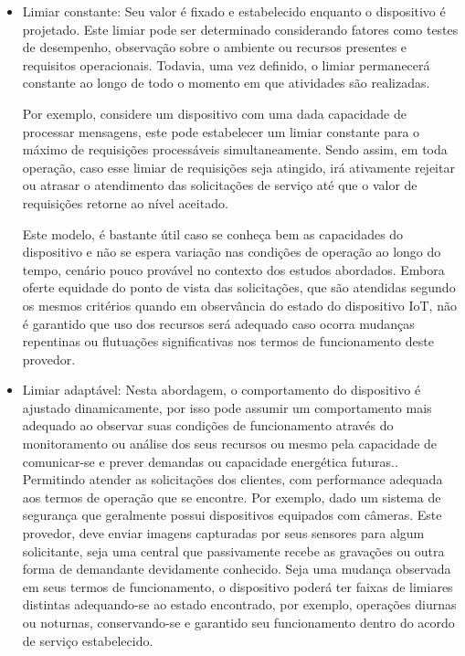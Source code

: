 \begin{itemize}
    \item Limiar constante: Seu valor é fixado e estabelecido enquanto o dispositivo é projetado. Este limiar pode ser determinado considerando fatores como testes de desempenho, observação sobre o ambiente ou recursos presentes e requisitos operacionais. Todavia, uma vez definido, o limiar permanecerá constante ao longo de todo o momento em que  atividades são realizadas.
    
    Por exemplo, considere um dispositivo com uma dada capacidade de processar mensagens, este pode estabelecer um limiar constante para o máximo de requisições processáveis simultaneamente. Sendo assim, em toda operação, caso esse limiar de requisições seja atingido, irá ativamente rejeitar ou atrasar o atendimento das solicitações de serviço até que o valor de requisições retorne ao nível aceitado. 
    
    Este modelo, é bastante útil caso se conheça bem as capacidades do dispositivo e não se espera variação nas condições de operação ao longo do tempo, cenário pouco provável no contexto dos estudos abordados. Embora oferte equidade do ponto de vista das solicitações, que são atendidas segundo os mesmos critérios quando em observância do estado do dispositivo \acs{IoT}, não é garantido que uso dos recursos será adequado caso ocorra mudanças repentinas ou flutuações significativas nos termos de funcionamento deste provedor.
    
    \item Limiar adaptável: Nesta abordagem, o comportamento do dispositivo é ajustado dinamicamente, por isso pode assumir um comportamento mais adequado ao observar suas condições de funcionamento através do monitoramento ou análise dos seus recursos ou mesmo pela capacidade de comunicar-se e prever demandas ou capacidade energética futuras.. Permitindo atender as solicitações dos clientes, com performance adequada aos termos de operação que se encontre. Por exemplo, dado um sistema de segurança que geralmente possui dispositivos equipados com câmeras. Este provedor, deve enviar imagens capturadas por seus sensores para algum solicitante, seja uma central que passivamente recebe as gravações ou outra forma de demandante devidamente conhecido. Seja uma mudança observada em seus termos de funcionamento, o dispositivo poderá ter faixas de limiares distintas adequando-se ao estado encontrado, por exemplo, operações diurnas ou noturnas, conservando-se e garantido seu funcionamento dentro do acordo de serviço estabelecido.   
    
\end{itemize}

